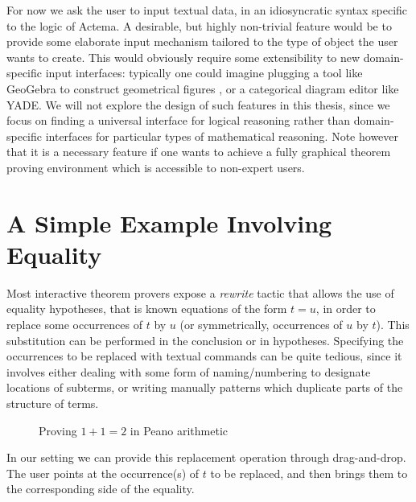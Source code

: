 For now we ask the user to input textual data, in an idiosyncratic syntax
specific to the logic of Actema. A desirable, but highly non-trivial feature
would be to provide some elaborate input mechanism tailored to the type of
object the user wants to create. This would obviously require some extensibility
to new domain-specific input interfaces: typically one could imagine plugging a
tool like GeoGebra to construct geometrical figures , or a
categorical diagram editor like YADE. We will not explore the design of such features in this thesis, since we
focus on finding a universal interface for logical reasoning rather than
domain-specific interfaces for particular types of mathematical
reasoning. Note however that it
is a necessary feature if one wants to achieve a fully graphical theorem proving
environment which is accessible to non-expert users.

\section{A Simple Example Involving Equality}

Most interactive theorem provers expose a \emph{rewrite} tactic that allows the
use of equality hypotheses, that is known equations of the form $t = u$, in
order to replace some occurrences of $t$ by $u$ (or symmetrically, occurrences
of $u$ by $t$). This substitution can be performed in the conclusion or in
hypotheses. Specifying the occurrences to be replaced with textual commands can
be quite tedious, since it involves either dealing with some form of
naming/numbering to designate locations of subterms, or writing manually
patterns which duplicate parts of the structure of terms.

\begin{figure*}
  \begin{center}
  \end{center}
  \caption{Proving $1 + 1 = 2$ in Peano arithmetic}
\end{figure*}

In our setting we can provide this replacement operation through
drag-and-drop. The user points at the occurrence(s) of $t$ to be
replaced, and then brings them to the corresponding side of the
equality.

